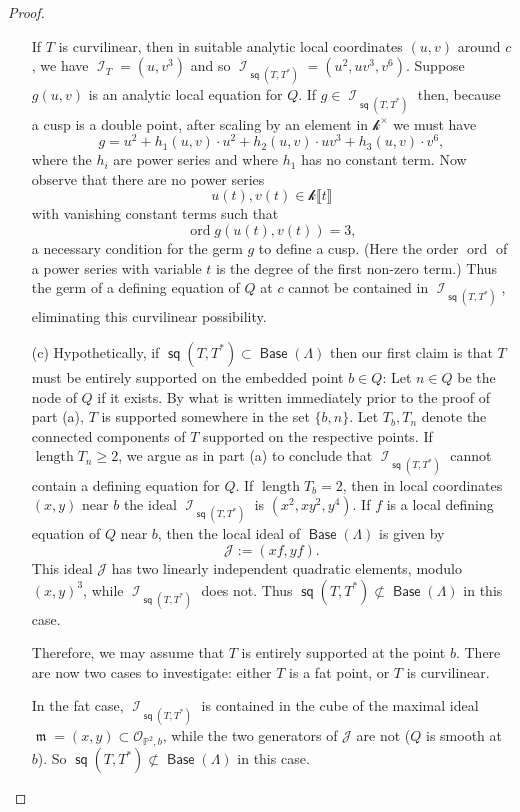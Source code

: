 \documentclass[reqno, 11pt]{amsart}
\theoremstyle{plain}
\theoremstyle{remark}
\renewcommand{\P}{\mathbb{P}}
\renewcommand{\k}{\mathscr{k}}
\DeclareMathOperator{\I}{\mathcal{I}}
\renewcommand{\O}{\mathcal{O}}
\DeclareMathOperator{\s}{\mathsf{sq}}
\DeclareMathOperator{\Base}{\mathsf{Base}}
\DeclareMathOperator{\m}{\mathfrak{m}}
\DeclareMathOperator{\ord}{ord}
\DeclareMathOperator{\length}{length}
\begin{document}
\begin{proof}
\begin{enumerate}
        If $T$ is curvilinear, then in suitable analytic local coordinates $(u,v)$ around $c$, we have $\I_{T} = (u,v^{3})$ and so $\I_{\s(T,T^{*})} = (u^{2},uv^{3},v^{6})$. Suppose $g(u,v)$ is an analytic local equation for $Q$. If $g \in \I_{\s(T,T^{*})}$ then, because a cusp is a double point, after scaling by an element in $\k^{\times}$ we must have $$g = u^{2} + h_1(u,v) \cdot u^{2} + h_2(u,v) \cdot uv^{3} + h_{3}(u,v) \cdot v^{6},$$ where the $h_{i}$ are power series and where $h_{1}$ has no constant term.  Now observe that there are no power series $$u(t),v(t) \in \k \llbracket t \rrbracket$$ with vanishing constant terms such that $$\ord g(u(t),v(t)) = 3,$$ a necessary condition for the germ $g$ to define a cusp. (Here the order $\ord$ of a power series with variable $t$ is the degree of the first non-zero term.) Thus the germ of a defining equation of $Q$ at $c$ cannot be contained in $\I_{\s(T,T^{*})}$, eliminating this curvilinear possibility. 

        \item[(c)] Hypothetically, if  $\s(T,T^{*}) \subset \Base (\Lambda)$ then our first claim is that $T$ must be entirely supported on the embedded point $b \in Q$:  Let $n \in Q$ be the node of $Q$ if it exists. By what is written immediately prior to the proof of part (a),  $T$ is supported somewhere in the set $\{b,n\}$. Let $T_{b}, T_{n}$ denote the connected components of $T$ supported on the respective points.  If $\length T_{n} \geq 2$, we argue as in part (a) to conclude that $\I_{\s(T,T^{*})}$ cannot contain a defining equation for $Q$.  If $\length T_{b} = 2$, then in local coordinates $(x,y)$ near $b$ the ideal $\I_{\s(T,T^{*})}$ is $(x^{2},xy^{2},y^{4})$. If  $f$ is a local defining equation of $Q$ near $b$, then the local ideal of $\Base (\Lambda)$ is given by $$\mathcal{J} := (xf,yf).$$  This ideal $\mathcal{J}$ has two linearly independent quadratic elements, modulo $(x,y)^{3}$, while $\I_{\s(T,T^{*})}$ does not.  Thus $\s(T,T^{*}) \nsubset \Base (\Lambda)$ in this case. 
        
        Therefore, we may assume that $T$ is entirely supported at the point $b$.  There are now two cases to investigate: either $T$ is a fat point, or $T$ is curvilinear. 
        
        In the fat case, $\I_{\s(T,T^*)}$ is contained in the cube of the maximal ideal $\m = (x,y) \subset \O_{\P^{2},b}$, while the two generators of $\mathcal{J}$ are not ($Q$ is smooth at $b$). So $\s(T,T^{*}) \not\subset \Base(\Lambda)$ in this case. 
        

\end{enumerate}
\end{proof}
\end{document}
